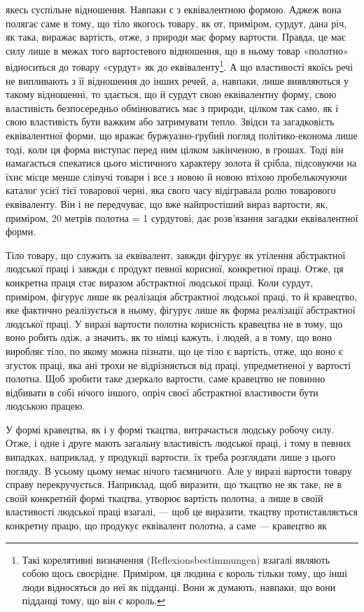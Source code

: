 \parcont{}  %
якесь суспільне відношення. Навпаки є з еквівалентною формою. Аджеж вона полягає саме в тому, що
тіло якогось товару, як от, приміром, сурдут, дана річ, як така, виражає вартість, отже, з природи
має форму вартости. Правда, це має силу лише в межах того вартостевого відношення, що в ньому товар
«полотно» відноситься до товару «сурдут» як до еквіваленту\footnote{
Такі корелятивні визначення (Reflexionsbestimmungen) взагалі являють собою щось своєрідне.
Приміром, ця людина є король тільки тому, що інші люди відносяться до неї як підданці. Вони ж
думають, навпаки, що вони підданці тому, що він є король.
}. А що властивості
якоїсь речі не випливають з її відношення до інших речей, а, навпаки, лише виявляються у такому
відношенні, то здається, що й сурдут свою еквівалентну форму, свою властивість безпосередньо
обмінюватись має з природи, цілком так само, як і свою властивість бути важким або затримувати
тепло. Звідси та загадковість еквівалентної форми, що вражає буржуазно-грубий погляд
політико-економа лише тоді, коли ця форма виступає перед ним цілком закінченою, в грошах. Тоді він
намагається спекатися цього містичного характеру золота й срібла, підсовуючи на їхнє місце менше
сліпучі товари і все з новою й новою втіхою пробелькочуючи каталог усієї тієї товарової черні, яка
свого часу відігравала ролю товарового еквіваленту. Він і не передчуває, що вже найпростіший вираз
вартости, як, приміром, 20 метрів полотна = 1 сурдутові, дає розв’язання загадки еквівалентної
форми.

Тіло товару, що служить за еквівалент, завжди фігурує як утілення абстрактної людської праці і
завжди є продукт певної корисної, конкретної праці. Отже, ця конкретна праця стає виразом
абстрактної людської праці. Коли сурдут, приміром, фігурує лише як реалізація абстрактної людської
праці, то й кравецтво, яке фактично реалізується в ньому, фігурує лише як форма реалізації
абстрактної людської праці. У виразі вартости полотна корисність кравецтва не в тому, що воно робить
одіж, а значить, як то німці кажуть, і людей, а в тому, що воно виробляє тіло, по якому можна
пізнати, що це тіло є вартість, отже, що воно є згусток праці, яка ані трохи не відрізняється від
праці, упредметненої у вартості полотна. Щоб зробити таке дзеркало вартости, саме кравецтво не
повинно відбивати в собі нічого іншого, опріч своєї абстрактної властивости бути людською працею.

У формі кравецтва, як і у формі ткацтва, витрачається людську робочу силу. Отже, і одне і друге
мають загальну властивість людської праці, і тому в певних випадках, наприклад, у продукції
вартости, їх треба розглядати лише з цього погляду. В усьому цьому немає нічого таємничого. Але у
виразі вартости товару справу перекручується. Наприклад, щоб виразити, що ткацтво не як таке, не в
своїй конкретній формі ткацтва, утворює вартість полотна, а лише в своїй властивості людської праці
взагалі, — щоб це виразити, ткацтву протиставляється конкретну працю, що продукує еквівалент
полотна, а саме — кравецтво як
\parbreak{}  %
